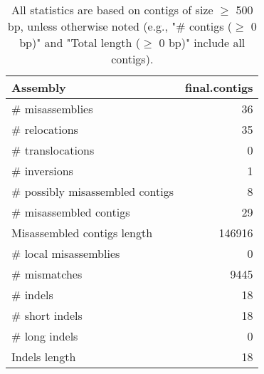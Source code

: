 \documentclass[12pt,a4paper]{article}
\begin{document}
\begin{table}[ht]
\begin{center}
\caption{All statistics are based on contigs of size $\geq$ 500 bp, unless otherwise noted (e.g., "\# contigs ($\geq$ 0 bp)" and "Total length ($\geq$ 0 bp)" include all contigs).}
\begin{tabular}{|l*{1}{|r}|}
\hline
Assembly & final.contigs \\ \hline
\# misassemblies & 36 \\ \hline
\hspace{5mm}\# relocations & 35 \\ \hline
\hspace{5mm}\# translocations & 0 \\ \hline
\hspace{5mm}\# inversions & 1 \\ \hline
\# possibly misassembled contigs & 8 \\ \hline
\# misassembled contigs & 29 \\ \hline
Misassembled contigs length & 146916 \\ \hline
\# local misassemblies & 0 \\ \hline
\# mismatches & 9445 \\ \hline
\# indels & 18 \\ \hline
\hspace{5mm}\# short indels & 18 \\ \hline
\hspace{5mm}\# long indels & 0 \\ \hline
Indels length & 18 \\ \hline
\end{tabular}
\end{center}
\end{table}
\end{document}
